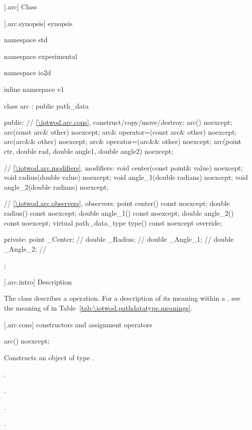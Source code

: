  [\iotwod.arc] {Class }

 [\iotwod.arc.synopsis] { synopsis}

\begin{codeblock}
namespace std { namespace experimental { namespace io2d { inline namespace v1 {
  class arc : public path_data {
  public:
    // \ref{\iotwod.arc.cons}, construct/copy/move/destroy:
    arc() noexcept;
    arc(const arc& other) noexcept;
    arc& operator=(const arc& other) noexcept;
    arc(arc&& other) noexcept;
    arc& operator=(arc&& other) noexcept;
    arc(point ctr, double rad, double angle1, double angle2) noexcept;

    // \ref{\iotwod.arc.modifiers}, modifiers:
    void center(const point& value) noexcept;
    void radius(double value) noexcept;
    void angle_1(double radians) noexcept;
    void angle_2(double radians) noexcept;

    // \ref{\iotwod.arc.observers}, observers:
    point center() const noexcept;
    double radius() const noexcept;
    double angle_1() const noexcept;
    double angle_2() const noexcept;
    virtual path_data_type type() const noexcept override;

  private:
    point _Center;   // \expos
    double _Radius;  // \expos
    double _Angle_1; // \expos
    double _Angle_2; // \expos
  };
} } } }
\end{codeblock}

 [\iotwod.arc.intro] { Description}

\pnum
{}
The class  describes a  operation. For a description of its meaning within a , see the meaning of  in Table~\ref{tab:\iotwod.pathdatatype.meanings}.

 [\iotwod.arc.cons] { constructors and assignment operators}

\begin{itemdecl}
    arc() noexcept;
\end{itemdecl}
\begin{itemdescr}
	\pnum
	\effects
	Constructs an object of type .
	
	\pnum
	\postconditions
	.

	.

	.

	.

\end{itemdescr}

